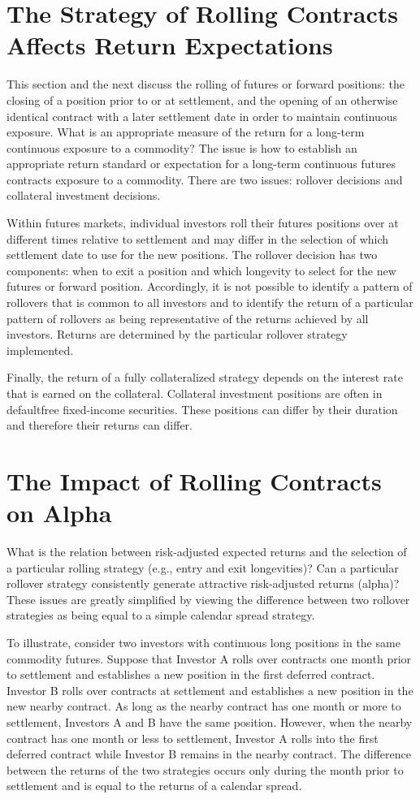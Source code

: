 \documentclass[11pt]{article}
\begin{document}
\section*{The Strategy of Rolling Contracts Affects Return Expectations}
This section and the next discuss the rolling of futures or forward positions: the closing of a position prior to or at settlement, and the opening of an otherwise identical contract with a later settlement date in order to maintain continuous exposure. What is an appropriate measure of the return for a long-term continuous exposure to a commodity? The issue is how to establish an appropriate return standard or expectation for a long-term continuous futures contracts exposure to a commodity. There are two issues: rollover decisions and collateral investment decisions.

Within futures markets, individual investors roll their futures positions over at different times relative to settlement and may differ in the selection of which settlement date to use for the new positions. The rollover decision has two components: when to exit a position and which longevity to select for the new futures or forward position. Accordingly, it is not possible to identify a pattern of rollovers that is common to all investors and to identify the return of a particular pattern of rollovers as being representative of the returns achieved by all investors. Returns are determined by the particular rollover strategy implemented.

Finally, the return of a fully collateralized strategy depends on the interest rate that is earned on the collateral. Collateral investment positions are often in defaultfree fixed-income securities. These positions can differ by their duration and therefore their returns can differ.

\section*{The Impact of Rolling Contracts on Alpha}
What is the relation between risk-adjusted expected returns and the selection of a particular rolling strategy (e.g., entry and exit longevities)? Can a particular rollover strategy consistently generate attractive risk-adjusted returns (alpha)? These issues are greatly simplified by viewing the difference between two rollover strategies as being equal to a simple calendar spread strategy.

To illustrate, consider two investors with continuous long positions in the same commodity futures. Suppose that Investor A rolls over contracts one month prior to settlement and establishes a new position in the first deferred contract. Investor B rolls over contracts at settlement and establishes a new position in the new nearby contract. As long as the nearby contract has one month or more to settlement, Investors A and B have the same position. However, when the nearby contract has one month or less to settlement, Investor A rolls into the first deferred contract while Investor B remains in the nearby contract. The difference between the returns of the two strategies occurs only during the month prior to settlement and is equal to the returns of a calendar spread.
\end{document}
